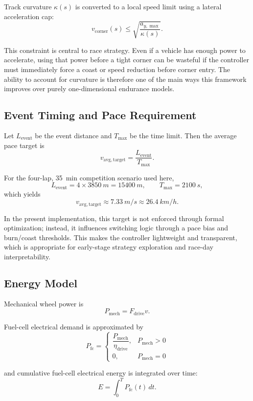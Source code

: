 \documentclass[11pt]{article}
\begin{document}
Track curvature \(\kappa(s)\) is converted to a local speed limit using a lateral acceleration cap:
\[
v_{\mathrm{corner}}(s) \le \sqrt{\frac{a_{y,\max}}{\kappa(s)}}.
\]

This constraint is central to race strategy. Even if a vehicle has enough power to accelerate, using that power before a tight corner can be wasteful if the controller must immediately force a coast or speed reduction before corner entry. The ability to account for curvature is therefore one of the main ways this framework improves over purely one-dimensional endurance models.

\subsection{Event Timing and Pace Requirement}

Let \(L_{\mathrm{event}}\) be the event distance and \(T_{\max}\) be the time limit. Then the average pace target is
\[
v_{\mathrm{avg,target}} = \frac{L_{\mathrm{event}}}{T_{\max}}.
\]

For the four-lap, \SI{35}{min} competition scenario used here,
\[
L_{\mathrm{event}} = 4 \times \SI{3850}{m} = \SI{15400}{m},
\qquad
T_{\max} = \SI{2100}{s},
\]
which yields
\[
v_{\mathrm{avg,target}} \approx \SI{7.33}{m/s} \approx \SI{26.4}{km/h}.
\]

In the present implementation, this target is not enforced through formal optimization; instead, it influences switching logic through a pace bias and burn/coast thresholds. This makes the controller lightweight and transparent, which is appropriate for early-stage strategy exploration and race-day interpretability.

\subsection{Energy Model}

Mechanical wheel power is
\[
P_{\mathrm{mech}} = F_{\mathrm{drive}}v.
\]

Fuel-cell electrical demand is approximated by
\[
P_{\mathrm{fc}} =
\begin{cases}
\dfrac{P_{\mathrm{mech}}}{\eta_{\mathrm{drive}}}, & P_{\mathrm{mech}} > 0 \\
0, & P_{\mathrm{mech}} = 0
\end{cases}
\]

and cumulative fuel-cell electrical energy is integrated over time:
\[
E = \int_0^T P_{\mathrm{fc}}(t)\,dt.
\]
\end{document}
